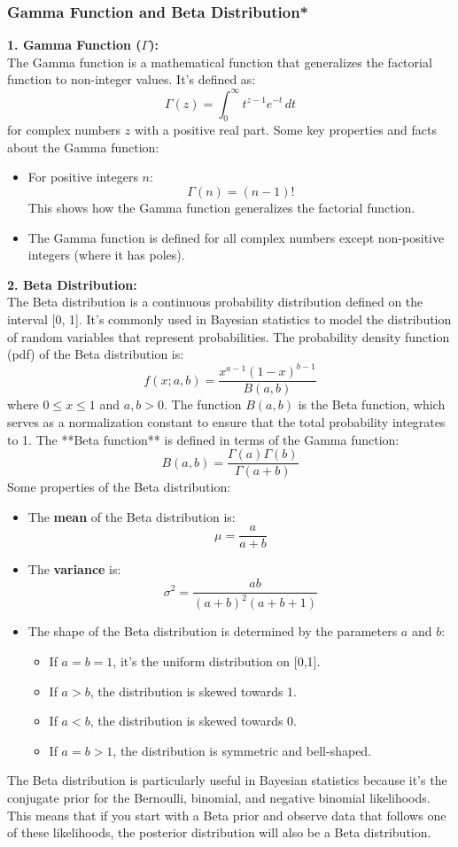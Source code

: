 \documentclass{article}
\begin{document}
\subsubsection{Gamma Function and Beta Distribution*}
\textbf{1. Gamma Function (\( \Gamma \)): }\\
The Gamma function is a mathematical function that generalizes the factorial function to non-integer values. It's defined as:
\[ \Gamma(z) = \int_0^\infty t^{z-1} e^{-t} \, dt \]
for complex numbers \( z \) with a positive real part.
Some key properties and facts about the Gamma function:
\begin{itemize}
  \item For positive integers \( n \):
  \[ \Gamma(n) = (n-1)! \]
  This shows how the Gamma function generalizes the factorial function.
  
  \item The Gamma function is defined for all complex numbers except non-positive integers (where it has poles).
\end{itemize}
\textbf{2. Beta Distribution: }\\
The Beta distribution is a continuous probability distribution defined on the interval [0, 1]. It's commonly used in Bayesian statistics to model the distribution of random variables that represent probabilities.
The probability density function (pdf) of the Beta distribution is:
\[ f(x; a, b) = \frac{x^{a-1} (1-x)^{b-1}}{B(a,b)} \]
where \( 0 \leq x \leq 1 \) and \( a, b > 0 \). The function \( B(a,b) \) is the Beta function, which serves as a normalization constant to ensure that the total probability integrates to 1.
The **Beta function** is defined in terms of the Gamma function:
\[ B(a,b) = \frac{\Gamma(a) \Gamma(b)}{\Gamma(a+b)} \]
Some properties of the Beta distribution:
\begin{itemize}
  \item The \textbf{mean} of the Beta distribution is:
  \[ \mu = \frac{a}{a+b} \]
  
  \item The \textbf{variance} is:
  \[ \sigma^2 = \frac{ab}{(a+b)^2(a+b+1)} \]

  \item The shape of the Beta distribution is determined by the parameters \( a \) and \( b \):
  \begin{itemize}
    \item If \( a = b = 1 \), it's the uniform distribution on [0,1].
    \item If \( a > b \), the distribution is skewed towards 1.
    \item If \( a < b \), the distribution is skewed towards 0.
    \item If \( a = b > 1 \), the distribution is symmetric and bell-shaped.
  \end{itemize}
\end{itemize}
The Beta distribution is particularly useful in Bayesian statistics because it's the conjugate prior for the Bernoulli, binomial, and negative binomial likelihoods. This means that if you start with a Beta prior and observe data that follows one of these likelihoods, the posterior distribution will also be a Beta distribution.
\end{document}
